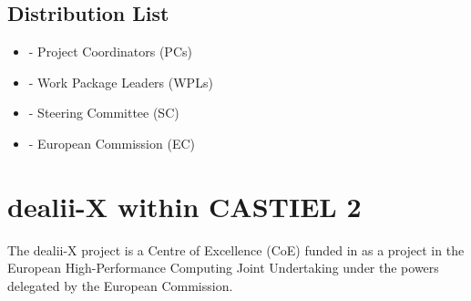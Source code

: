 \documentclass[a4paper,12pt]{article}
\begin{document}
\subsection*{{Distribution List}}
\begin{itemize}
    \item [] - Project Coordinators (PCs)
    \item [] - Work Package Leaders (WPLs)
    \item [] - Steering Committee (SC)
    \item [] - European Commission (EC)
\end{itemize}

\vspace*{2cm}

\disclaimer

\newpage


\newpage
\section{dealii-X within CASTIEL 2}

The dealii-X project is a Centre of Excellence (CoE) funded in as a project in
the European High-Performance Computing Joint Undertaking under the powers
delegated by the European Commission.
\end{document}
